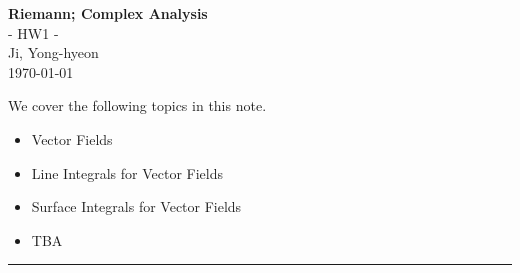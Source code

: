 \documentclass[11pt,openany]{article}
\begin{document}
\begin{center}
	\huge\textbf{Riemann; Complex Analysis}\\
	\Large - HW1 -\\
	\vspace{0.5em}
	\large{Ji, Yong-hyeon}\\
	\vspace{0.5em}
	\normalsize{\today}\\
\end{center}

\noindent 
We cover the following topics in this note.
\begin{itemize}
	\item Vector Fields
	\item Line Integrals for Vector Fields
	\item Surface Integrals for Vector Fields
	\item TBA
\end{itemize}
\hrule\vspace{12pt}
\end{document}
